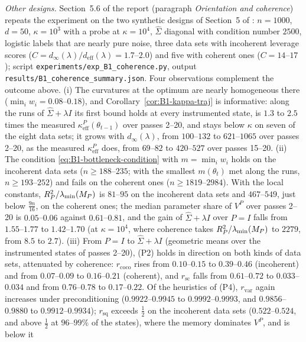 \emph{Other designs.} Section~5.6 of the report (paragraph \emph{Orientation and coherence}) repeats the experiment on
the two synthetic designs of Section~5 of \cite{na2023hessian}: $n=1000$, $d=50$, $\kappa=10^3$ with a probe at
$\kappa=10^4$, $\hat\Sigma$ diagonal with condition number $2500$, logistic labels that are nearly pure noise, three data
sets with incoherent leverage scores ($C=d_\infty(\lambda)/d_{\mathrm{eff}}(\lambda)=1.7$--$2.0$) and five with coherent
ones ($C=14$--$17$); script \texttt{experiments/exp\_B1\_coherence.py}, output
\texttt{results/B1\_coherence\_summary.json}. Four observations complement the outcome above.
(i) The curvatures at the optimum are nearly homogeneous there ($\min_iw_i=0.08$--$0.18$), and
Corollary~\ref{cor:B1-kappa-traj} is informative: along the runs of $\hat\Sigma+\lambda I$ its first bound holds at every
instrumented state, is $1.3$ to $2.5$ times the measured $\kappa^P_{\mathrm{eff}}(\theta_{t-1})$ over passes 2--20, and
stays below $\kappa$ on seven of the eight data sets; it grows with $d_\infty(\lambda)$, from $100$--$132$ to
$621$--$1065$ over passes 2--20, as the measured $\kappa^P_{\mathrm{eff}}$ does, from $69$--$82$ to $420$--$527$ over
passes 15--20.
(ii) The condition \eqref{eq:B1-bottleneck-condition} with $m=\min_iw_i$ holds on the incoherent data sets
($n\ge188$--$235$; with the smallest $m(\theta_t)$ met along the runs, $n\ge193$--$252$) and fails on the coherent ones
($n\ge1819$--$2984$). With the local constants, $R_P^2/\lambda_{\min}(M_P)$ is $81$--$95$ on the incoherent data sets and
$467$--$549$, just below $\frac{9n}{16}$, on the coherent ones; the median parameter share of $V^P$ over passes 2--20 is
$0.05$--$0.06$ against $0.61$--$0.81$, and the gain of $\hat\Sigma+\lambda I$ over $P=I$ falls from $1.55$--$1.77$ to
$1.42$--$1.70$ (at $\kappa=10^4$, where coherence takes $R_P^2/\lambda_{\min}(M_P)$ to $2279$, from $8.5$ to $2.7$).
(iii) From $P=I$ to $\hat\Sigma+\lambda I$ (geometric means over the instrumented states of passes 2--20), (P2) holds in
direction on both kinds of data sets, attenuated by coherence: $r_{\mathrm{coco}}$ rises from $0.10$--$0.15$ to
$0.39$--$0.46$ (incoherent) and from $0.07$--$0.09$ to $0.16$--$0.21$ (coherent), and $r_{\mathrm{sc}}$ falls from
$0.61$--$0.72$ to $0.033$--$0.034$ and from $0.76$--$0.78$ to $0.17$--$0.22$. Of the heuristics of (P4),
$r_{\mathrm{var}}$ again increases under preconditioning ($0.9922$--$0.9945$ to $0.9992$--$0.9993$, and
$0.9856$--$0.9880$ to $0.9912$--$0.9934$); $r_{\mathrm{sq}}$ exceeds $\frac12$ on the incoherent data sets
($0.522$--$0.524$, and above $\frac12$ at $96$--$99\%$ of the states), where the memory dominates $V^P$, and is below it
